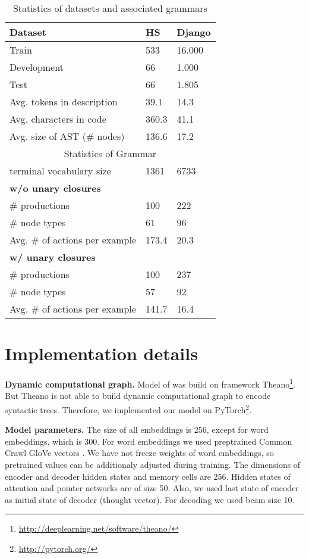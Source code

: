 \begin{table}
\centering
\begin{tabular}[h]{ l l l }
\hline
\textbf{Dataset} & \textbf{HS} & \textbf{Django} \\
\hline 
Train & 533 & 16.000 \\ 
Development & 66 & 1.000 \\ 
Test & 66 & 1.805 \\ 
\hline
Avg. tokens in description & 39.1 & 14.3 \\
Avg. characters in code & 360.3 & 41.1 \\
Avg. size of AST (\# nodes) & 136.6 & 17.2 \\
 \hline
 \hline
\multicolumn{3}{c}{Statistics of Grammar} \\
terminal vocabulary size & 1361 & 6733 \\ 
\hline
\multicolumn{3}{l}{\textbf{w/o unary closures}} \\
\# productions & 100 & 222 \\
\# node types & 61 & 96 \\
Avg. \# of actions per example & 173.4 & 20.3 \\ 
\hline
\multicolumn{3}{l}{\textbf{w/ unary closures}} \\
\# productions & 100 & 237 \\
\# node types & 57 & 92 \\
Avg. \# of actions per example & 141.7 & 16.4 \\ 
\hline
\end{tabular}
\caption[Statistics of datasets]{Statistics of datasets and associated grammars \parencite{Yin2017}}
\end{table}

\section{Implementation details}

\textbf{Dynamic computational graph.} Model of \cite{Yin2017} was build on framework Theano\footnote{\href{http://deeplearning.net/software/theano/}{http://deeplearning.net/software/theano/}}. But Theano is not able to build dynamic computational graph to encode syntactic trees. Therefore, we implemented our model on PyTorch\footnote{\href{http://pytorch.org/}{http://pytorch.org/}}.

\textbf{Model parameters.} The size of all embeddings is 256, except for word embeddings, which is 300. For word embeddings we used preptrained Common Crawl GloVe vectors \parencite{pennington2014}. We have not freeze weights of word embeddings, so  pretrained values can be additionaly adjusted during training. The dimensions of encoder and decoder hidden states and memory cells are 256. Hidden states of attention and pointer networks are of size 50. Also, we used last state of encoder as initial state of decoder (thought vector). For decoding we used beam size 10.

